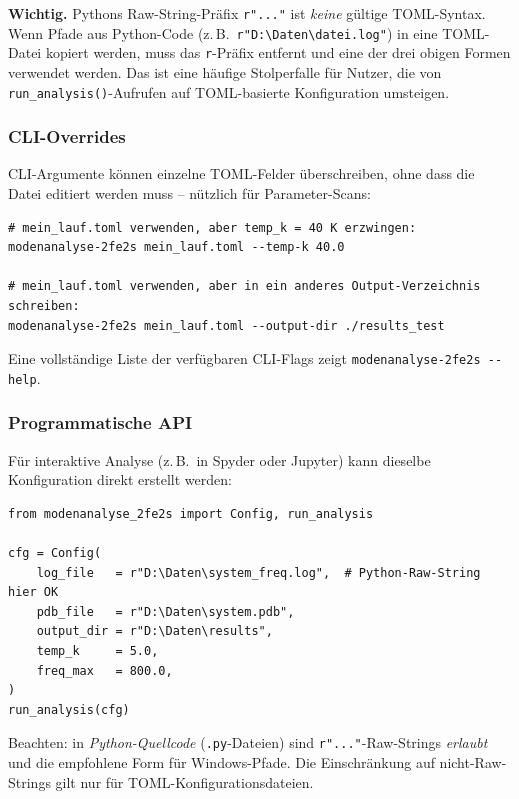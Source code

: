 \documentclass[11pt,a4paper,twoside]{article}
\theoremstyle{remark}
\begin{document}
\begin{warnbox}
\textbf{Wichtig.} Pythons Raw-String-Pr\"afix \texttt{r"..."} ist
\emph{keine} g\"ultige TOML-Syntax. Wenn Pfade aus Python-Code
(z.\,B.\ \texttt{r"D:\textbackslash{}Daten\textbackslash{}datei.log"})
in eine TOML-Datei kopiert werden, muss das \texttt{r}-Pr\"afix
entfernt und eine der drei obigen Formen verwendet werden. Das ist
eine h\"aufige Stolperfalle f\"ur Nutzer, die von
\texttt{run\_analysis()}-Aufrufen auf TOML-basierte Konfiguration
umsteigen.
\end{warnbox}

\subsubsection*{CLI-Overrides}

CLI-Argumente k\"onnen einzelne TOML-Felder \"uberschreiben, ohne
dass die Datei editiert werden muss -- n\"utzlich f\"ur
Parameter-Scans:

\begin{lstlisting}[style=bash]
# mein_lauf.toml verwenden, aber temp_k = 40 K erzwingen:
modenanalyse-2fe2s mein_lauf.toml --temp-k 40.0

# mein_lauf.toml verwenden, aber in ein anderes Output-Verzeichnis schreiben:
modenanalyse-2fe2s mein_lauf.toml --output-dir ./results_test
\end{lstlisting}

Eine vollst\"andige Liste der verf\"ugbaren CLI-Flags zeigt
\texttt{modenanalyse-2fe2s -{}-help}.

\subsubsection*{Programmatische API}

F\"ur interaktive Analyse (z.\,B.\ in Spyder oder Jupyter) kann
dieselbe Konfiguration direkt erstellt werden:

\begin{lstlisting}[style=python]
from modenanalyse_2fe2s import Config, run_analysis

cfg = Config(
    log_file   = r"D:\Daten\system_freq.log",  # Python-Raw-String hier OK
    pdb_file   = r"D:\Daten\system.pdb",
    output_dir = r"D:\Daten\results",
    temp_k     = 5.0,
    freq_max   = 800.0,
)
run_analysis(cfg)
\end{lstlisting}

Beachten: in \emph{Python-Quellcode} (\texttt{.py}-Dateien) sind
\texttt{r"..."}-Raw-Strings \emph{erlaubt} und die empfohlene Form
f\"ur Windows-Pfade. Die Einschr\"ankung auf nicht-Raw-Strings gilt
nur f\"ur TOML-Konfigurationsdateien.
\end{document}
